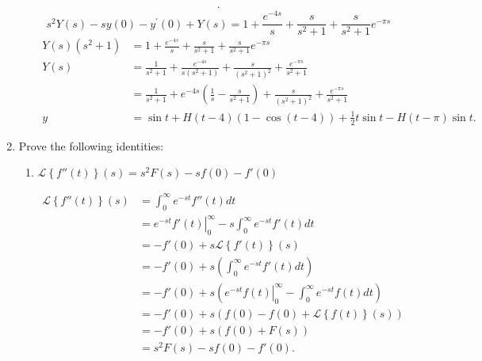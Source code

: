 \documentclass{zc-ust-hw}
\renewcommand{\L}[1]{\mathscr{L}\left\{#1\right\}}
\begin{document}
\begin{enumerate}
\begin{enumerate}
\begin{sol}
\begin{align}
              .\end{align}
              \begin{equation}
                s^2 Y(s)-sy(0)-y^{\prime}(0)+Y(s) = 1+\frac{e^{-4s}}{s}+\frac{s}{s^2+1}+\frac{s}{s^2+1}e^{-\pi s}
              \end{equation}
              \begin{align}
                Y(s)(s^2+1) &= 1+\frac{e^{-4s}}{s}+\frac{s}{s^2+1}+\frac{s}{s^2+1}e^{-\pi s} \\
                Y(s) &= \frac{1}{s^2+1}+\frac{e^{-4s}}{s(s^2+1)}+\frac{s}{(s^2+1)^2}+\frac{e^{-\pi s}}{s^2+1} \\
                 &= \frac{1}{s^2+1}+{e^{-4s}}(\frac{1}{s}-\frac{s}{s^2+1})+\frac{s}{(s^2+1)^2}+\frac{e^{-\pi s}}{s^2+1} \\
                y &= \sin t + H(t-4)\left( 1-\cos (t-4) \right) +
                \frac{1}{2}t\sin t -H(t-\pi)\sin t
              .\end{align}
            \end{sol}
    \end{enumerate}

  \item Prove the following identities:
    \begin{enumerate}
      \item $\L{f''(t)}(s) = s^2F(s)-sf(0)-f'(0) $
        \begin{sol}
          \begin{align}
            \L{f''(t)}(s) &= \int_{0}^{\infty} e^{-st}f''(t)dt \\
            &= \left. e^{-st}f'(t) \right|_{0}^{\infty} - s\int_{0}^{\infty} e^{-st}f'(t)dt \\
            &= -f'(0)+s\L{f'(t)}(s) \\
            &= -f'(0)+s\left( \int_{0}^{\infty} e^{-st}f'(t)dt \right) \\
            &= -f'(0)+s\left( \left. e^{-st}f(t) \right|_{0}^{\infty} - \int_{0}^{\infty} e^{-st}f(t)dt \right) \\
            &= -f'(0)+s\left( f(0)-f(0)+\L{f(t)}(s) \right) \\
            &= -f'(0)+s\left( f(0)+F(s) \right) \\
            &= s^2F(s)-sf(0)-f'(0)
          .\end{align}
        \end{sol}

        \newpage


\end{enumerate}
\end{enumerate}
\end{document}
